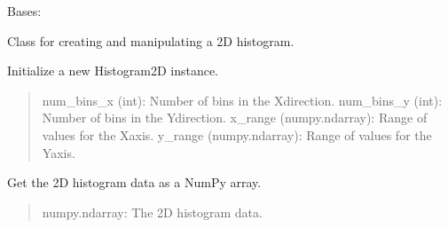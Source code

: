 \documentclass[letterpaper,10pt,english]{sphinxmanual}
\begin{document}

\begin{fulllineitems}
\label{\detokenize{HF:Histogram.Histogram2D}}
\pysigstartsignatures
{}
\pysigstopsignatures
\sphinxAtStartPar
Bases: 

\sphinxAtStartPar
Class for creating and manipulating a 2D histogram.

\begin{fulllineitems}
\label{\detokenize{HF:Histogram.Histogram2D.__init__}}
\pysigstartsignatures
{}
\pysigstopsignatures
\sphinxAtStartPar
Initialize a new Histogram2D instance.
\begin{quote}\begin{description}
\sphinxAtStartPar
num\_bins\_x (int): Number of bins in the X\sphinxhyphen{}direction.
num\_bins\_y (int): Number of bins in the Y\sphinxhyphen{}direction.
x\_range (numpy.ndarray): Range of values for the X\sphinxhyphen{}axis.
y\_range (numpy.ndarray): Range of values for the Y\sphinxhyphen{}axis.

\end{description}\end{quote}

\end{fulllineitems}


\begin{fulllineitems}
\label{\detokenize{HF:Histogram.Histogram2D.histogram_2d}}
\pysigstartsignatures
{}
\pysigstopsignatures
\sphinxAtStartPar
Get the 2D histogram data as a NumPy array.
\begin{quote}\begin{description}
\sphinxAtStartPar
numpy.ndarray: The 2D histogram data.


\end{description}
\end{quote}
\end{fulllineitems}
\end{fulllineitems}
\end{document}
